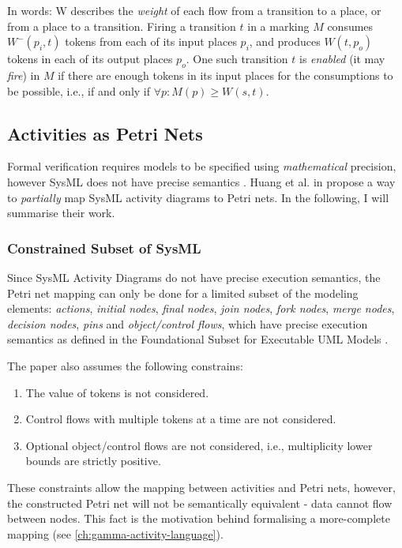 In words: W describes the \emph{weight} of each flow from a transition to a place, or from a place to a transition. Firing a transition \(t\) in a marking \(M\) consumes \(W^-(p_i, t)\) tokens from each of its input places \(p_i\), and produces \(W(t, p_o)\) tokens in each of its output places \(p_o\). One such transition \(t\) is \emph{enabled} (it may \emph{fire}) in \(M\) if there are enough tokens in its input places for the consumptions to be possible, i.e., if and only if \( \forall p : M(p) \ge W(s, t)\).

\subsection{Activities as Petri Nets}\label{ssec:activities-as-petri-nets}

Formal verification requires models to be specified using \emph{mathematical} precision, however SysML does not have precise semantics \cite{pssm-testing, pssm, euml}. Huang et al. in \cite{https://doi.org/10.1002/sys.21524} propose a way to \emph{partially} map SysML activity diagrams to Petri nets. In the following, I will summarise their work.

\subsubsection{Constrained Subset of SysML}\label{ssec:sysml_assumptions}

Since SysML Activity Diagrams do not have precise execution semantics, the Petri net mapping can only be done for a limited subset of the modeling elements: \emph{actions}, \emph{initial nodes}, \emph{final nodes}, \emph{join nodes}, \emph{fork nodes}, \emph{merge nodes}, \emph{decision nodes}, \emph{pins} and \emph{object/control flows}, which have precise execution semantics as defined in the Foundational Subset for Executable UML Models \cite{fuml}.

The paper also assumes the following constrains:

\begin{enumerate}
	\item The value of tokens is not considered.
	\item Control flows with multiple tokens at a time are not considered.
	\item Optional object/control flows are not considered, i.e., multiplicity lower bounds are strictly positive.
\end{enumerate}

These constraints allow the mapping between activities and Petri nets, however, the constructed Petri net will not be semantically equivalent - data cannot flow between nodes. This fact is the motivation behind formalising a more-complete mapping (see \autoref{ch:gamma-activity-language}).

